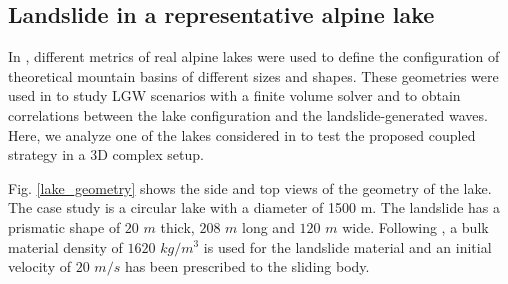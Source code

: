 
\subsection{Landslide in a representative alpine lake}
\label{Example3}

In \cite{app112411614}, different metrics of real alpine lakes were used to define the configuration of theoretical mountain basins of different sizes and shapes. These geometries were used in \cite{app112411614} to study LGW scenarios with a finite volume solver and to obtain correlations between the lake configuration and the landslide-generated waves. Here, we analyze one of the lakes considered in \cite{app112411614} to test the proposed coupled strategy in a 3D complex setup. 

Fig. \ref{lake_geometry} shows the side and top views of the geometry of the lake. 
The case study is a circular lake with a diameter of 1500 m. The landslide has a prismatic shape of $20$ $m$ thick, $208$ $m$ long and $120$ $m$ wide. Following \cite{app112411614}, a bulk material density of $1620$ $kg/m ^3$ is used for the landslide material and an initial velocity of $20$ $m/s$ has been prescribed to the sliding body.


